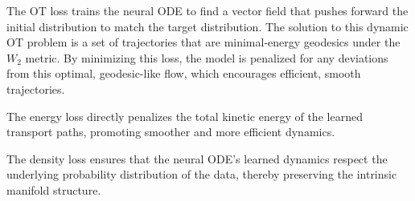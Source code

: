 \documentclass[11pt]{article}
\begin{document}
The OT loss trains the neural ODE to find a vector field that pushes forward the initial 
distribution to match the target distribution. The solution to this dynamic OT 
problem is a set of trajectories that are minimal-energy geodesics under the \(W_{2}\) metric. 
By minimizing this loss, the model is penalized for any deviations from this optimal, geodesic-like flow, 
which encourages efficient, smooth trajectories.

The energy loss directly penalizes the total kinetic energy of the learned transport paths, 
promoting smoother and more efficient dynamics. 

The density loss ensures that the neural ODE's learned dynamics respect the underlying probability 
distribution of the data, thereby preserving the intrinsic manifold structure. 




\end{document}
